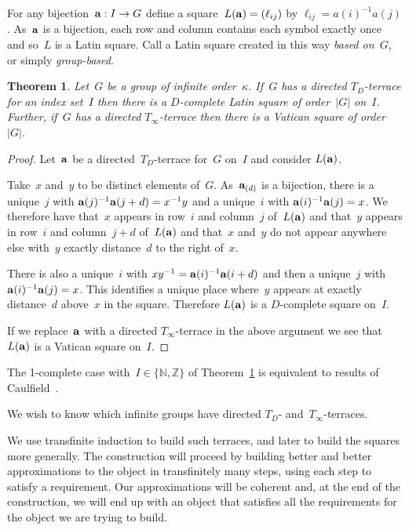 \documentclass[12pt,a4paper]{article}
\newtheorem{thm}{Theorem}[section]
\newcommand{\Z}{\mathbb{Z}}
\newcommand{\N}{\mathbb{N}}
\begin{document}
For any bijection~${\bf a}: I \rightarrow G$ define a square~$L({\bf a}) = (\ell_{ij})$ by $\ell_{ij} = a(i)^{-1}a(j)$.   As~${\bf a}$ is a bijection, each row and column contains each symbol exactly once and so~$L$ is a Latin square.  Call a Latin square created in this way {\em based on~$G$}, or simply {\em group-based}.

\begin{thm}\label{th:terrace2square}
Let~$G$ be a group of infinite order~$\kappa$.  If~$G$ has a directed $T_{D}$-terrace for an index set~$I$ then there is a $D$-complete Latin square of order~$|G|$ on~$I$.  Further, if~$G$ has a directed $T_{\infty}$-terrace then there is a Vatican square of order~$|G|$.
\end{thm}

\begin{proof}
Let~${\bf a}$ be a directed~$T_D$-terrace for~$G$ on~$I$ and consider $L({\bf a})$.

Take~$x$ and~$y$ to be distinct elements of~$G$.  As~${\bf a}_{(d)}$ is a bijection, there is a unique~$j$ with ${\bf a}(j)^{-1}{\bf a}(j+d) = x^{-1}y$ and a unique~$i$ with ${\bf a}(i)^{-1}{\bf a}(j)=x$.  We therefore have that~$x$ appears in row~$i$ and column~$j$ of~$L({\bf a})$ and that~$y$ appears in row~$i$ and column~$j+d$ of~$L({\bf a})$ and that~$x$ and~$y$ do not appear anywhere else with~$y$ exactly distance~$d$  to the right of~$x$.

There is also a unique~$i$ with $xy^{-1} = {\bf a}(i)^{-1}{\bf a}(i+d)$ and then a unique~$j$ with ${\bf a}(i)^{-1}{\bf a}(j)=x$.  This identifies a unique place where~$y$ appears at exactly distance~$d$ above~$x$ in the square.  Therefore $L({\bf a})$ is a $D$-complete square on~$I$.

If we replace~${\bf a}$ with a directed $T_{\infty}$-terrace in the above argument we see that~$L({\bf a})$ is a Vatican square on~$I$.
\end{proof}

The 1-complete case with~$I \in \{ \N, \Z \}$ of Theorem~\ref{th:terrace2square} is equivalent to results of Caulfield~\cite{Caulfield96}.

We wish to know which infinite groups have directed $T_D$- and~$T_{\infty}$-terraces.  

We use transfinite induction to build such terraces, and later to build the squares more generally. 
The construction will proceed by building better and better approximations to the object in transfinitely many steps, using each step to satisfy a requirement. Our approximations will be coherent and, at the end of the construction, we will end up with an object that satisfies all the requirements for the object we are trying to build.
\end{document}
